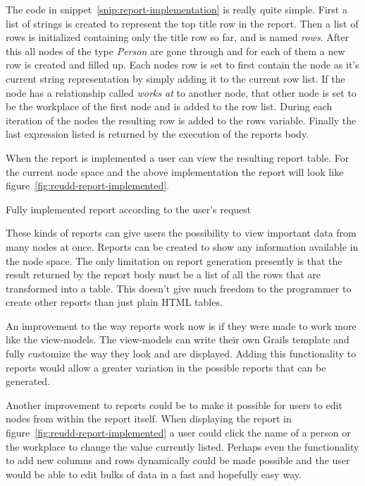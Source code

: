 \documentclass[a4paper]{report}
\begin{document}
The code in snippet~\ref{snip:report-implementation} is really quite simple. First a list of strings is created to represent the top title row in the report. Then a list of rows is initialized containing only the title row so far, and is named \emph{rows}. After this all nodes of the type \emph{Person} are gone through and for each of them a new row is created and filled up. Each nodes row is set to first contain the node as it's current string representation by simply adding it to the current row list. If the node has a relationship called \emph{works at} to another node, that other node is set to be the workplace of the first node and is added to the row list. During each iteration of the nodes the resulting row is added to the rows variable. Finally the last expression listed is returned by the execution of the reports body.

When the report is implemented a user can view the resulting report table. For the current node space and the above implementation the report will look like figure~\ref{fig:reudd-report-implemented}.

	{Fully implemented report according to the user's request}

These kinds of reports can give users the possibility to view important data from many nodes at once. Reports can be created to show any information available in the node space. The only limitation on report generation presently is that the result returned by the report body must be a list of all the rows that are transformed into a table. This doesn't give much freedom to the programmer to create other reports than just plain HTML tables.

An improvement to the way reports work now is if they were made to work more like the view-models. The view-models can write their own Grails template and fully customize the way they look and are displayed. Adding this functionality to reports would allow a greater variation in the possible reports that can be generated.

Another improvement to reports could be to make it possible for users to edit nodes from within the report itself. When displaying the report in figure~\ref{fig:reudd-report-implemented} a user could click the name of a person or the workplace to change the value currently listed. Perhaps even the functionality to add new columns and rows dynamically could be made possible and the user would be able to edit bulks of data in a fast and hopefully easy way.
\end{document}
